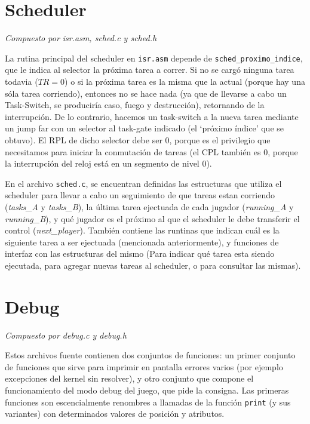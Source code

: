 \documentclass{article}
\begin{document}
	\section{Scheduler}
	\vspace{-1cm}
	\begin{flushright}
	\textit{Compuesto por isr.asm, sched.c y sched.h}
	\end{flushright}

	La rutina principal del scheduler en \texttt{isr.asm} depende de
    \texttt{sched\_proximo\_indice}, que le indica al selector la próxima tarea a correr. Si no se
    cargó ninguna tarea todavia ($TR = 0$) o si la próxima tarea es la misma que la actual (porque
    hay una sóla tarea corriendo), entonces no se hace nada (ya que de llevarse a cabo un
    Task-Switch, se produciría caso, fuego y destrucción), retornando de la interrupción. De lo contrario, hacemos un task-switch a la nueva tarea mediante un jump far con un selector al task-gate indicado (el `próximo índice' que se obtuvo). El RPL de dicho selector debe ser 0, porque es el privilegio que necesitamos para iniciar la conmutación de tareas (el CPL también es 0, porque la interrupción del reloj está en un segmento de nivel 0).

	En el archivo \texttt{sched.c}, se encuentran definidas las estructuras que utiliza el scheduler
    para llevar a cabo un seguimiento de que tareas estan corriendo (\textit{tasks\_A} y
    \textit{tasks\_B}), la última tarea ejectuada de cada jugador (\textit{running\_A} y
    \textit{running\_B}), y qué jugador es el próximo al que el scheduler le debe transferir el
    control (\textit{next\_player}). También contiene las runtinas que indican cuál es la siguiente
    tarea a ser ejectuada (mencionada anteriormente), y funciones de interfaz con las estructuras
    del mismo (Para indicar qué tarea esta siendo ejecutada, para agregar nuevas tareas al
    scheduler, o para consultar las mismas).



	\section{Debug}
	\vspace{-1cm}
	\begin{flushright}
		\textit{Compuesto por debug.c y debug.h}
	\end{flushright}
	Estos archivos fuente contienen dos conjuntos de funciones: un primer conjunto de funciones que sirve para imprimir en pantalla errores varios (por ejemplo excepciones del kernel sin resolver), y otro conjunto que compone el funcionamiento del modo debug del juego, que pide la consigna. Las primeras funciones son escencialmente renombres a llamadas de la función \texttt{print} (y sus variantes) con determinados valores de posición y atributos.
\end{document}
